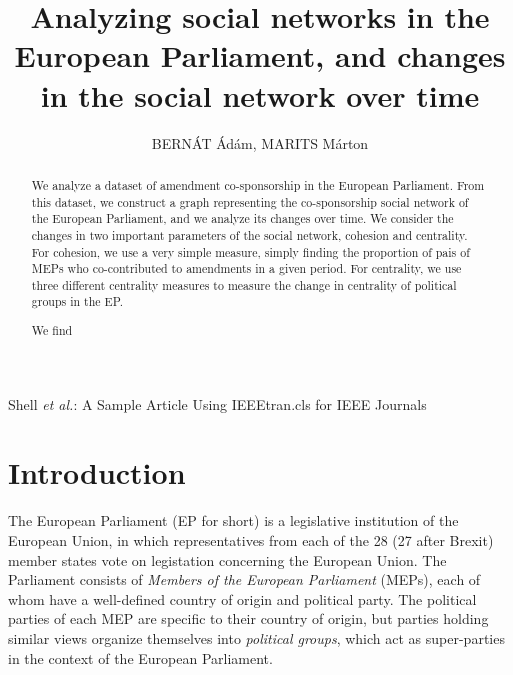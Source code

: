 \documentclass[lettersize,journal]{IEEEtran}
\begin{document}
\title{Analyzing social networks in the European Parliament, and changes in the social network over time}

\author{{BERNÁT Ádám, MARITS Márton}
}

%
{Shell \MakeLowercase{\textit{et al.}}: A Sample Article Using IEEEtran.cls for IEEE Journals}


\maketitle

\begin{abstract}
	We analyze a dataset of amendment co-sponsorship in the European Parliament. From this dataset, we construct a graph representing the co-sponsorship social network of the European Parliament, and we analyze its changes over time. We consider the changes in two important parameters of the social network, cohesion and centrality. For cohesion, we use a very simple measure, simply finding the proportion of pais of MEPs who co-contributed to amendments in a given period. For centrality, we use three different centrality measures to measure the change in centrality of political groups in the EP.
	
	We find %
\end{abstract}

\section{Introduction} \label{sec:intro}

The European Parliament (EP for short) is a legislative institution of the European Union, in which representatives from each of the 28 (27 after Brexit) member states vote on legistation concerning the European Union. The Parliament consists of \textit{Members of the European Parliament} (MEPs), each of whom have a well-defined country of origin and political party. The political parties of each MEP are specific to their country of origin, but parties holding similar views organize themselves into \textit{political groups}, which act as super-parties in the context of the European Parliament.
\end{document}
